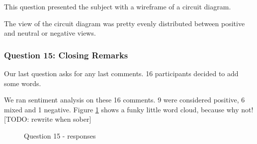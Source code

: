 This question presented the subject with a wireframe of a circuit diagram.

The view of the circuit diagram was pretty evenly distributed between positive and neutral or negative views.

\subsubsection{Question 15: Closing Remarks}

Our last question asks for any last comments.
16 participants decided to add some words.

We ran sentiment analysis on these 16 comments.
9 were considered positive, 6 mixed and 1 negative.
Figure \ref{fig:Q15_wordcloud} shows a funky little word cloud, because why not! [TODO: rewrite when sober]

\begin{figure}[H]
    \centering
    \caption{Question 15 - responses}
    \label{fig:Q15_wordcloud}
\end{figure}

